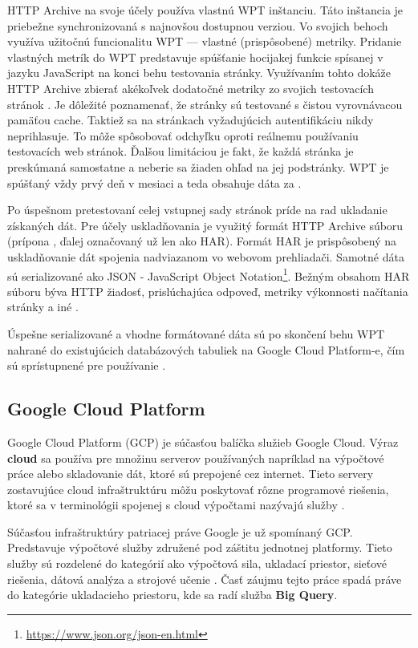 HTTP Archive na svoje účely používa vlastnú WPT inštanciu. 
Táto inštancia je priebežne synchronizovaná s najnovšou dostupnou verziou.
Vo svojich behoch využíva užitočnú funcionalitu WPT --- vlastné (prispôsobené) metriky.
Pridanie vlastných metrík do WPT predstavuje spúšťanie hocijakej funkcie spísanej v jazyku JavaScript na konci behu testovania stránky. 
Využívaním tohto dokáže HTTP Archive zbierať akékoľvek dodatočné metriky zo svojich testovacích stránok \cite{webpagetest}.
Je dôležité poznamenať, že stránky sú testované s čistou vyrovnávacou pamäťou cache. Taktiež sa na stránkach vyžadujúcich autentifikáciu nikdy neprihlasuje.
To môže spôsobovať odchyľku oproti reálnemu používaniu testovacích web stránok. Ďalšou limitáciou je fakt, že každá stránka je preskúmaná samostatne a neberie sa žiaden ohľad na jej podstránky.
WPT je spúšťaný vždy prvý deň v mesiaci a teda obsahuje dáta za . 

Po úspešnom pretestovaní celej vstupnej sady stránok príde na rad ukladanie získaných dát.
Pre účely uskladňovania je využitý formát HTTP Archive súboru (prípona , ďalej označovaný už len ako HAR).
Formát HAR je prispôsobený na uskladňovanie dát spojenia nadviazanom vo webovom prehliadači. Samotné dáta sú serializované ako JSON - JavaScript Object Notation\footnote{\href{https://www.json.org/json-en.html}{https://www.json.org/json-en.html}}.
Bežným obsahom HAR súboru býva HTTP žiadosť, prislúchajúca odpoveď, metriky výkonnosti načítania stránky a iné \cite{httparchive-harfile}.

Úspešne serializované a vhodne formátované dáta sú po skončení behu WPT nahrané do existujúcich databázových tabuliek na Google Cloud Platform-e, čím sú sprístupnené pre používanie \cite{httparchive-faq}. 

\subsection{Google Cloud Platform}
Google Cloud Platform (GCP) je súčasťou balíčka služieb Google Cloud. 
Výraz \textbf{cloud} sa používa pre množinu serverov používaných napríklad na výpočtové práce alebo skladovanie dát, ktoré sú prepojené cez internet.
Tieto servery zostavujúce cloud infraštruktúru môžu poskytovať rôzne programové riešenia, ktoré sa v terminológii spojenej s cloud výpočtami nazývajú služby \cite{cloudflare-clouddefinition}.

Súčasťou infraštruktúry patriacej práve Google je už spomínaný GCP. Predstavuje výpočtové služby združené pod záštitu jednotnej platformy.
Tieto služby sú rozdelené do kategórií ako výpočtová sila, ukladací priestor, sieťové riešenia, dátová analýza a strojové učenie \cite{gfg-gcp}.
Časť záujmu tejto práce spadá práve do kategórie ukladacieho priestoru, kde sa radí služba \textbf{Big Query}.

